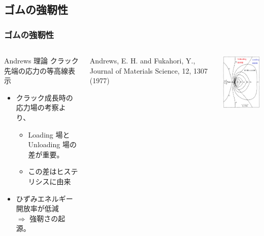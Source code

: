 \documentclass[11pt, dvipdfmx]{beamer}
\begin{document}
\subsection{ゴムの強靭性}
\begin{frame}
\frametitle{ゴムの強靭性}


\begin{columns}[totalwidth=1\textwidth]
\begin{exampleblock}{Andrews 理論}
クラック先端の応力の等高線表示
	\begin{itemize}
	\item
	クラック成長時の応力場の考察より、
		\begin{itemize}
		\item
		{\color{red} Loading 場とUnloading 場の差}が重要。
		\item
		この差は\alert{ヒステリシスに由来}
		\end{itemize}	
	\item
	\alert{ひずみエネルギー開放率が低減} \\$\Rightarrow$ 強靭さの起源。
	\end{itemize}
\end{exampleblock}

{Andrews, E. H. and Fukahori, Y., Journal of Materials Science, 12, 1307 (1977)}

\centering
\includegraphics[width=40mm]{./fig/crack.png}
\end{columns}
\end{frame}
\end{document}
